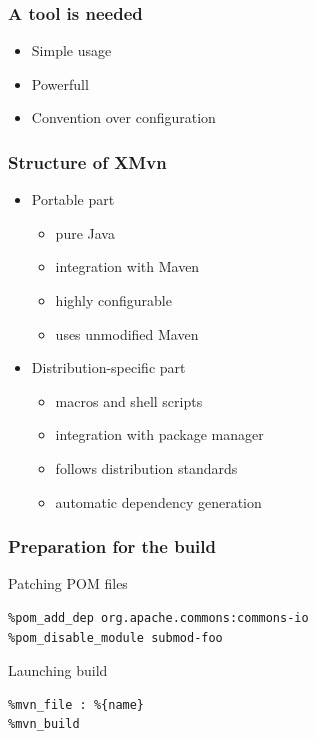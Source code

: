\documentclass[pdftex,unicode,xcolor=table]{beamer}
\begin{document}
\begin{frame}
  \frametitle{A tool is needed}
  \begin{itemize}
    \item Simple usage
    \item Powerfull
    \item Convention over configuration
  \end{itemize}
\end{frame}

\begin{frame}
  \frametitle{Structure of XMvn}
  \begin{itemize}
    \item Portable part
    \begin{itemize}
      \item pure Java
      \item integration with Maven
      \item highly configurable
      \item uses unmodified Maven
    \end{itemize}
    \item Distribution-specific part
    \begin{itemize}
      \item macros and shell scripts
      \item integration with package manager
      \item follows distribution standards
      \item automatic dependency generation
    \end{itemize}
  \end{itemize}
\end{frame}


\begin{frame}[fragile]
  \frametitle{Preparation for the build}
  \begin{block}{Patching POM files}
    \scriptsize
\begin{verbatim}
%pom_add_dep org.apache.commons:commons-io
%pom_disable_module submod-foo
\end{verbatim}
  \end{block}
  \begin{block}{Launching build}
    \scriptsize
\begin{verbatim}
%mvn_file : %{name}
%mvn_build
\end{verbatim}
  \end{block}
\end{frame}
\end{document}
